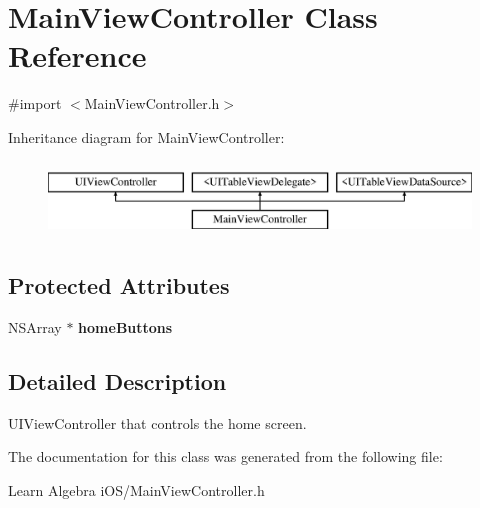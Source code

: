 \hypertarget{interface_main_view_controller}{\section{Main\-View\-Controller Class Reference}
\label{interface_main_view_controller}
}


{\ttfamily \#import $<$Main\-View\-Controller.\-h$>$}

Inheritance diagram for Main\-View\-Controller\-:\begin{figure}[H]
\begin{center}
\leavevmode
\includegraphics[height=2.000000cm]{interface_main_view_controller}
\end{center}
\end{figure}
\subsection*{Protected Attributes}
\begin{DoxyCompactItemize}
\item 
\hypertarget{interface_main_view_controller_adc49bfa4012a44595bb10f19fc220659}{N\-S\-Array $\ast$ {\bfseries home\-Buttons}}\label{interface_main_view_controller_adc49bfa4012a44595bb10f19fc220659}

\end{DoxyCompactItemize}


\subsection{Detailed Description}
U\-I\-View\-Controller that controls the home screen. 

The documentation for this class was generated from the following file\-:\begin{DoxyCompactItemize}
\item 
Learn Algebra i\-O\-S/Main\-View\-Controller.\-h\end{DoxyCompactItemize}
